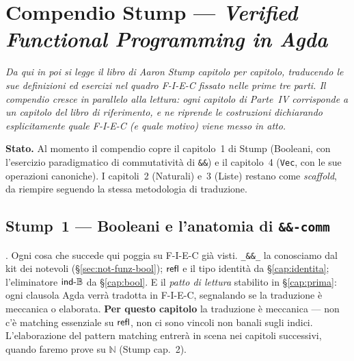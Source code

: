 \part{Compendio Stump --- \emph{Verified Functional Programming in Agda}}

\noindent\itshape Da qui in poi si legge il libro di Aaron Stump capitolo per capitolo, traducendo le sue definizioni ed esercizi nel quadro F-I-E-C fissato nelle prime tre parti. Il compendio cresce \emph{in parallelo} alla lettura: ogni capitolo di Parte~IV corrisponde a un capitolo del libro di riferimento, e ne riprende le costruzioni dichiarando esplicitamente quale F-I-E-C (e quale motivo) viene messo in atto.\upshape

\bigskip

\noindent\textbf{Stato.} Al momento il compendio copre il capitolo~1 di Stump (Booleani, con l'esercizio paradigmatico di commutativit\`a di \texttt{\&\&}) e il capitolo~4 (\texttt{Vec}, con le sue operazioni canoniche). I capitoli~2 (Naturali) e~3 (Liste) restano come \emph{scaffold}, da riempire seguendo la stessa metodologia di traduzione.

\bigskip

\chapter{Stump~1 --- Booleani e l'anatomia di \texttt{\&\&-comm}}\label{cap:stump-1}\label{cap:and-comm}

. Ogni cosa che succede qui poggia su F-I-E-C gi\`a visti. \texttt{\_\&\&\_} la conosciamo dal kit dei notevoli (\S\ref{sec:not-funz-bool}); $\mathsf{refl}$ e il tipo identit\`a da \S\ref{cap:identita}; l'eliminatore $\mathsf{ind\text{-}\mathbb{B}}$ da \S\ref{cap:bool}. E il \emph{patto di lettura} stabilito in \S\ref{cap:prima}: ogni clausola Agda verr\`a tradotta in F-I-E-C, segnalando se la traduzione \`e meccanica o elaborata. \textbf{Per questo capitolo} la traduzione \`e meccanica --- non c'\`e matching essenziale su $\mathsf{refl}$, non ci sono vincoli non banali sugli indici. L'elaborazione del pattern matching entrer\`a in scena nei capitoli successivi, quando faremo prove su $\mathbb{N}$ (Stump cap.~2).

